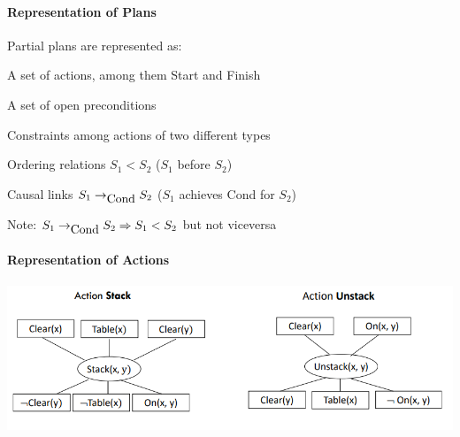 \documentclass[10pt]{report}
\begin{document}
\paragraph{Representation of Plans} Partial plans are represented as:\begin{list}{}{}
	\item A set of actions, among them Start and Finish
	\item A set of open preconditions
	\item Constraints among actions of two different types\begin{list}{}{}
		\item Ordering relations $S_1<S_2$ ($S_1$ before $S_2$)
		\item Causal links $S_1\rightarrow_{\hbox{Cond}}S_2$ ($S_1$ achieves Cond for $S_2$)
		\item Note: $S_1\rightarrow_{\hbox{Cond}}S_2\Rightarrow S_1<S_2$ but not viceversa 
	\end{list}
\end{list}
\paragraph{Representation of Actions}\begin{center}
	\includegraphics[scale=0.75]{28.png}
\end{center}
\end{document}
